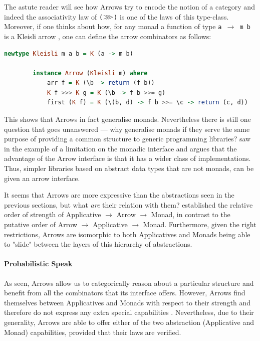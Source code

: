 \documentclass[
  oneside,
  11pt, a4paper,
  footinclude=true,
  headinclude=true,
  cleardoublepage=empty
]{scrbook}
\theoremstyle{definition}
\theoremstyle{definition}
\def\bindA{\mathbin{{>\hskip-1ex>\hskip-1ex>}}}
\begin{document}
    The astute reader will see how Arrows try to encode the notion of a category and indeed the associativity law of \texttt{($\bindA$)} is one of the laws of this type-class. Moreover, if one thinks about how, for any monad a function of type \texttt{a $\rightarrow$ m b} is a Kleisli arrow \citep{Awodey:2010:CT:2060081}, one can define the arrow combinators as follows:
    	        
                \begin{lstlisting}[mathescape, language=Haskell, caption={Arrow Kleisli type-class instance},captionpos=b]
        newtype Kleisli m a b = K (a -> m b)
    
        instance Arrow (Kleisli m) where
            arr f = K (\b -> return (f b))
            K f >>> K g = K (\b -> f b >>= g)
            first (K f) = K (\(b, d) -> f b >>= \c -> return (c, d))
                \end{lstlisting}{}
                
    This shows that Arrows in fact generalise monads. Nevertheless there is still one question that goes unanswered --- why generalise monads if they serve the same purpose of providing a common structure to generic programming libraries? \cite{Hughes:2000:GMA:347238.347246} saw in the example of \cite{swiestra&duponcheel} a limitation on the monadic interface and argues that the advantage of the Arrow interface is that it has a wider class of implementations. Thus, simpler libraries based on abstract data types that are not monads, can be given an arrow interface.
                
    It seems that Arrows are more expressive than the abstractions seen in the previous sections, but what \emph{are} their relation with them? \cite{Lindley:2011:IOA:1953652.1954016} established the relative order of strength of Applicative $\rightarrow$ Arrow $\rightarrow$ Monad, in contrast to the putative order of Arrow $\rightarrow$ Applicative $\rightarrow$ Monad. Furthermore, given the right restrictions, Arrows are isomorphic to both Applicatives and Monads being able to "slide" between the layers of this hierarchy of abstractions.
    	        
    	        \paragraph{Probabilistic Speak}
    	        
    As seen, Arrows allow us to categorically reason about a particular structure and benefit from all the combinators that its interface offers. However, Arrows find themselves between Applicatives and Monads with respect to their strength and therefore do not express any extra special capabilities \citep{Lindley:2011:IOA:1953652.1954016}. Nevertheless, due to their generality, Arrows are able to offer either of the two abstraction (Applicative and Monad) capabilities, provided that their laws are verified.
    	        
\end{document}
